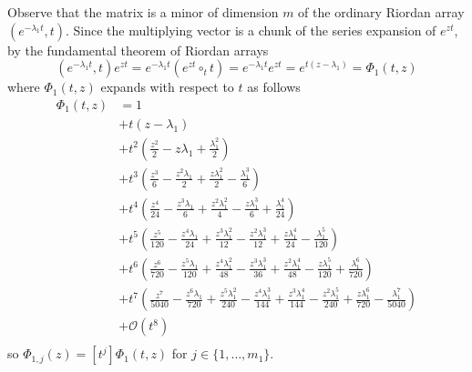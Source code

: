 Observe that the matrix is a minor of dimension $m$ of the ordinary Riordan
array $\left(e^{-\lambda_{1}t}, t\right)$. Since the multiplying vector is a
chunk of the series expansion of $e^{zt}$, by the fundamental theorem of
Riordan arrays
\begin{displaymath}
\left(e^{-\lambda_{1}t}, t\right)e^{zt} = e^{-\lambda_{1}t} \left(e^{zt}\circ_{t} t \right) =  e^{-\lambda_{1}t} e^{zt} = e^{t(z - \lambda_{1})} = \Phi_{1}(t, z)
\end{displaymath}
where $\Phi_{1}(t, z)$ expands with respect to $t$ as follows
\begin{displaymath}
\begin{split}
\Phi_{1}(t, z) &= 1 \\
               &+ t \left(z - \lambda_{1}\right) \\
               &+ t^{2} \left(\frac{z^{2}}{2} - z \lambda_{1} + \frac{\lambda_{1}^{2}}{2}\right) \\
               &+ t^{3} \left(\frac{z^{3}}{6} - \frac{z^{2} \lambda_{1}}{2} + \frac{z \lambda_{1}^{2}}{2} - \frac{\lambda_{1}^{3}}{6}\right) \\
               &+ t^{4} \left(\frac{z^{4}}{24} - \frac{z^{3} \lambda_{1}}{6} + \frac{z^{2} \lambda_{1}^{2}}{4} - \frac{z \lambda_{1}^{3}}{6} + \frac{\lambda_{1}^{4}}{24}\right) \\
               &+ t^{5} \left(\frac{z^{5}}{120} - \frac{z^{4} \lambda_{1}}{24} + \frac{z^{3} \lambda_{1}^{2}}{12} - \frac{z^{2} \lambda_{1}^{3}}{12} + \frac{z \lambda_{1}^{4}}{24} - \frac{\lambda_{1}^{5}}{120}\right)\\
               &+ t^{6} \left(\frac{z^{6}}{720} - \frac{z^{5} \lambda_{1}}{120} + \frac{z^{4} \lambda_{1}^{2}}{48} - \frac{z^{3} \lambda_{1}^{3}}{36} + \frac{z^{2} \lambda_{1}^{4}}{48} - \frac{z \lambda_{1}^{5}}{120} + \frac{\lambda_{1}^{6}}{720}\right)\\
               &+ t^{7} \left(\frac{z^{7}}{5040} - \frac{z^{6} \lambda_{1}}{720} + \frac{z^{5} \lambda_{1}^{2}}{240} - \frac{z^{4} \lambda_{1}^{3}}{144} + \frac{z^{3} \lambda_{1}^{4}}{144} - \frac{z^{2} \lambda_{1}^{5}}{240} + \frac{z \lambda_{1}^{6}}{720} - \frac{\lambda_{1}^{7}}{5040}\right) \\
               &+ \mathcal{O}\left(t^{8}\right)\\
\end{split}
\end{displaymath}
so $\Phi_{1, j}(z) = [t^{j}]\Phi_{1}(t, z)$ for $j \in  \lbrace 1,\ldots, m_{1} \rbrace$.\\\\

